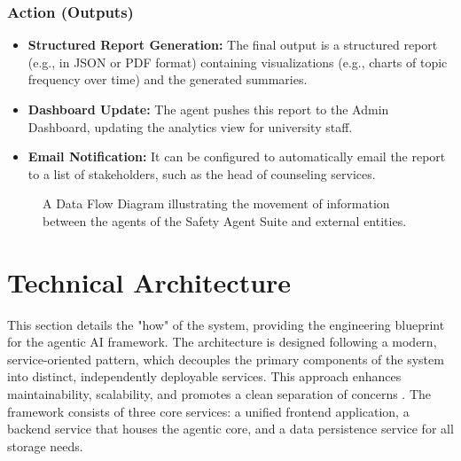 \subsubsection{Action (Outputs)}
\begin{itemize}
    \item \textbf{Structured Report Generation:} The final output is a structured report (e.g., in JSON or PDF format) containing visualizations (e.g., charts of topic frequency over time) and the generated summaries.
    \item \textbf{Dashboard Update:} The agent pushes this report to the Admin Dashboard, updating the analytics view for university staff.
    \item \textbf{Email Notification:} It can be configured to automatically email the report to a list of stakeholders, such as the head of counseling services.
\end{itemize}

\begin{figure}[h]
    \centering
    \caption{A Data Flow Diagram illustrating the movement of information between the agents of the Safety Agent Suite and external entities.}
    \label{fig:dfd}
\end{figure}



\section{Technical Architecture}
\label{chap:technical_architecture}

This section details the "how" of the system, providing the engineering blueprint for the agentic AI framework. The architecture is designed following a modern, service-oriented pattern, which decouples the primary components of the system into distinct, independently deployable services. This approach enhances maintainability, scalability, and promotes a clean separation of concerns \cite{FIND_CITATION_HERE}. The framework consists of three core services: a unified frontend application, a backend service that houses the agentic core, and a data persistence service for all storage needs.

